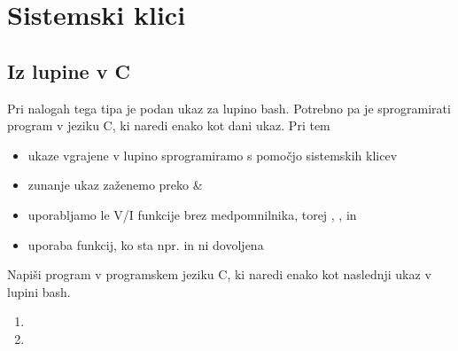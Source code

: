 \chapter{Sistemski klici}

\section{Iz lupine v C}

Pri nalogah tega tipa je podan ukaz za lupino bash. Potrebno pa je sprogramirati program v jeziku C, ki naredi enako kot dani ukaz. Pri tem
\begin{itemize}
	\item ukaze vgrajene v lupino sprogramiramo s pomočjo sistemskih klicev
	\item zunanje ukaz zaženemo preko  \& 
	\item uporabljamo le V/I funkcije brez medpomnilnika, torej , ,  in 
	\item uporaba funkcij, ko sta npr.  in  ni dovoljena
\end{itemize}


\begin{Exercise}
Napiši program v programskem jeziku C, ki naredi enako kot naslednji ukaz v lupini bash.
\begin{enumerate}
	\item {}
	\item {}
\end{enumerate}
\end{Exercise}

